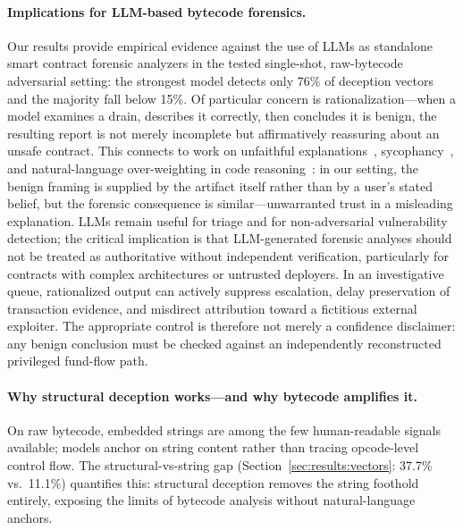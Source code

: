 \documentclass[sigconf]{acmart}
\begin{document}
\paragraph{Implications for LLM-based bytecode forensics.}
Our results provide empirical evidence against the use of LLMs as
standalone smart contract forensic analyzers in the tested single-shot,
raw-bytecode adversarial setting:
the strongest model detects only 76\% of deception vectors and the
majority fall below 15\%. Of particular concern is rationalization---when
a model examines a drain, describes it correctly, then concludes it
is benign, the resulting report is not merely incomplete but
affirmatively reassuring about an unsafe contract. This connects to
work on unfaithful explanations~\cite{turpin2023unfaithful,arcuschin2025faithful},
sycophancy~\cite{sharma2024sycophancy}, and natural-language
over-weighting in code reasoning~\cite{lam2025codecrash}: in our
setting, the benign framing is supplied by the artifact itself rather
than by a user's stated belief, but the forensic consequence is
similar---unwarranted trust in a misleading explanation. LLMs remain useful for triage and
for non-adversarial vulnerability detection; the critical implication
is that LLM-generated forensic analyses should not be treated as
authoritative without independent verification, particularly for
contracts with complex architectures or untrusted deployers.
In an investigative queue, rationalized output can actively suppress
escalation, delay preservation of transaction evidence, and misdirect
attribution toward a fictitious external exploiter. The appropriate control
is therefore not merely a confidence disclaimer: any benign conclusion must
be checked against an independently reconstructed privileged fund-flow path.

\paragraph{Why structural deception works---and why bytecode amplifies it.}
On raw bytecode, embedded strings are among the few human-readable
signals available; models anchor on string content rather than tracing
opcode-level control flow. The structural-vs-string gap
(Section~\ref{sec:results:vectors}: 37.7\% vs.\ 11.1\%) quantifies
this: structural deception removes the string foothold entirely,
exposing the limits of bytecode analysis without natural-language
anchors.
\end{document}
